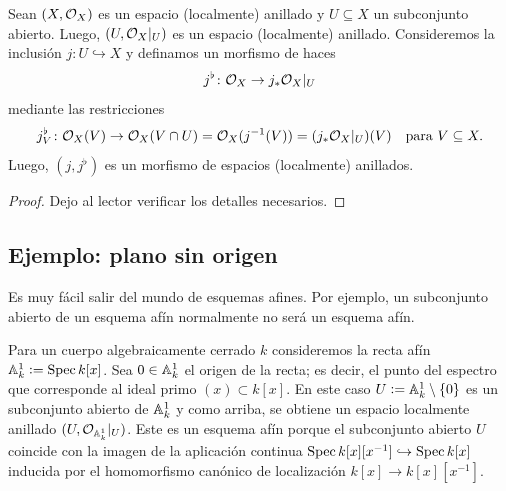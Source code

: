 \documentclass{article}
\numberwithin{equation}{section}
\theoremstyle{definition}
\begin{document}
\begin{proposicion}
  Sean $(X,\O_X)$ es un espacio (localmente) anillado y $U \subseteq X$
  un subconjunto abierto. Luego, $(U, \O_X|_U)$ es un espacio (localmente)
  anillado. Consideremos la inclusión $j\colon U \hookrightarrow X$ y definamos
  un morfismo de haces
  $$j^\flat\colon \O_X \to j_* \O_X|_U$$
  mediante las restricciones
  \[ j^\flat_V\colon \O_X (V) \to
     \O_X (V\cap U) = \O_X (j^{-1} (V)) = (j_* \O_X|_U) (V)
     \quad\text{para }V \subseteq X. \]
  Luego, $(j,j^\flat)$ es un morfismo de espacios (localmente) anillados.

  \begin{proof}
    Dejo al lector verificar los detalles necesarios.
  \end{proof}
\end{proposicion}

\subsection{Ejemplo: plano sin origen}

Es muy fácil salir del mundo de esquemas afines. Por ejemplo, un subconjunto
abierto de un esquema afín normalmente no será un esquema afín.

\begin{ejemplo}
  Para un cuerpo algebraicamente cerrado $k$ consideremos la recta afín
  $\AA^1_k \dfn \Spec k [x]$. Sea $0 \in \AA^1_k$ el origen de la recta;
  es decir, el punto del espectro que corresponde al ideal primo
  $(x) \subset k[x]$. En este caso $U \dfn \AA^1_k \setminus \{ 0 \}$ es
  un subconjunto abierto de $\AA^1_k$ y como arriba, se obtiene un espacio
  localmente anillado $(U, \O_{\AA^1_k}|_U)$. Este es un esquema afín porque
  el subconjunto abierto $U$ coincide con la imagen de la aplicación continua
  $\Spec k [x] [x^{-1}] \hookrightarrow \Spec k [x]$ inducida por
  el homomorfismo canónico de localización $k [x] \to k [x] [x^{-1}]$.
\end{ejemplo}
\end{document}
